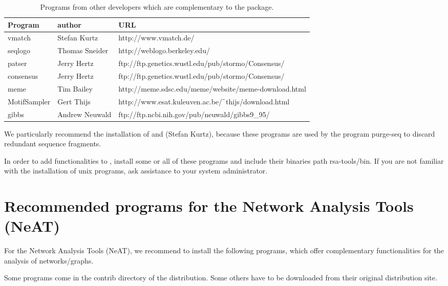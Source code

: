 \documentclass{book}
\begin{document}
\begin{table}
\begin{center}
\begin{tabular}{lll}
\hline
Program & author  & URL \\
\hline
vmatch & Stefan Kurtz & http://www.vmatch.de/ \\
seqlogo & Thomas Sneider & http://weblogo.berkeley.edu/ \\
patser & Jerry Hertz & ftp://ftp.genetics.wustl.edu/pub/stormo/Consensus/ \\
consensus & Jerry Hertz &  ftp://ftp.genetics.wustl.edu/pub/stormo/Consensus/ \\
meme & Tim Bailey & http://meme.sdsc.edu/meme/website/meme-download.html \\
MotifSampler & Gert Thijs & http://www.esat.kuleuven.ac.be/$\tilde{\hspace{0.4em}}$thijs/download.html \\
gibbs & Andrew Neuwald & ftp://ftp.ncbi.nih.gov/pub/neuwald/gibbs9\_95/ \\
\hline
\end{tabular}
\end{center}
\caption{\label{table:other_programs} Programs from other developers
  which are complementary to the \RSAT package.}
\end{table}

We particularly recommend the installation of  and
 (Stefan Kurtz), because these programs are used by
the program purge-seq to discard redundant sequence fragments.

In order to add functionalities to \RSAT, install some or all of these
programs and include their binaries path rsa-tools/bin. If you are not
familiar with the installation of unix programs, ask assistance to
your system administrator.


\section{Recommended programs for the Network Analysis Tools (NeAT)}


For the Network Analysis Tools (NeAT), we recommend to install the
following programs, which offer complementary functionalities for the
analysis of networks/graphs.

Some programs come in the contrib directory of the \RSAT
distribution. Some others have to be downloaded from their original
distribution site.
\end{document}
